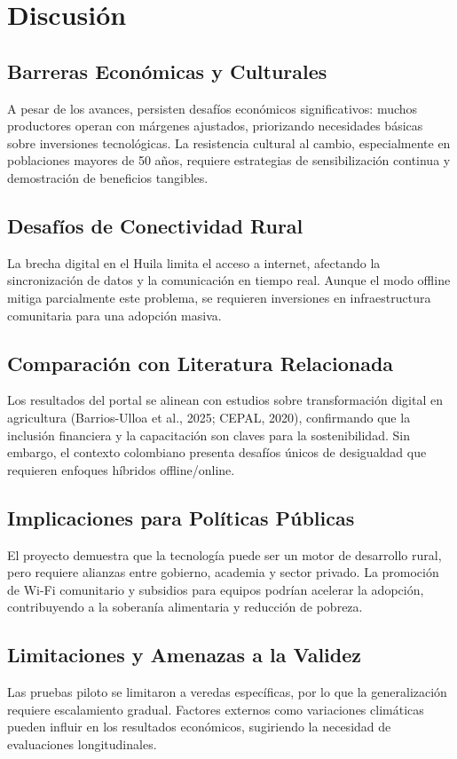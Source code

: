 \section{Discusión}

\subsection{Barreras Económicas y Culturales}
A pesar de los avances, persisten desafíos económicos significativos: muchos productores operan con márgenes ajustados, priorizando necesidades básicas sobre inversiones tecnológicas. La resistencia cultural al cambio, especialmente en poblaciones mayores de 50 años, requiere estrategias de sensibilización continua y demostración de beneficios tangibles.

\subsection{Desafíos de Conectividad Rural}
La brecha digital en el Huila limita el acceso a internet, afectando la sincronización de datos y la comunicación en tiempo real. Aunque el modo offline mitiga parcialmente este problema, se requieren inversiones en infraestructura comunitaria para una adopción masiva.

\subsection{Comparación con Literatura Relacionada}
Los resultados del portal se alinean con estudios sobre transformación digital en agricultura (Barrios-Ulloa et al., 2025; CEPAL, 2020), confirmando que la inclusión financiera y la capacitación son claves para la sostenibilidad. Sin embargo, el contexto colombiano presenta desafíos únicos de desigualdad que requieren enfoques híbridos offline/online.

\subsection{Implicaciones para Políticas Públicas}
El proyecto demuestra que la tecnología puede ser un motor de desarrollo rural, pero requiere alianzas entre gobierno, academia y sector privado. La promoción de Wi-Fi comunitario y subsidios para equipos podrían acelerar la adopción, contribuyendo a la soberanía alimentaria y reducción de pobreza.

\subsection{Limitaciones y Amenazas a la Validez}
Las pruebas piloto se limitaron a veredas específicas, por lo que la generalización requiere escalamiento gradual. Factores externos como variaciones climáticas pueden influir en los resultados económicos, sugiriendo la necesidad de evaluaciones longitudinales.

